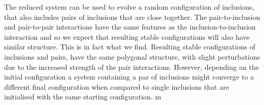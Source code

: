 
The reduced system can be used to evolve a random configuration of inclusions, that also includes pairs of inclusions that are close together. The pair-to-inclusion and pair-to-pair interactions have the same features as the inclusion-to-inclusion interaction and so we expect that resulting stable configurations will also have similar structure. This is in fact what we find. Resulting stable configurations of inclusions and pairs, have the same polygonal structure, with slight perturbations due to the increased strength of the pair interactions. However, depending an the initial configuration a system containing a par of inclusions might converge to a different final configuration when compared to single inclusions that are initialised with the same starting configuration.
m

